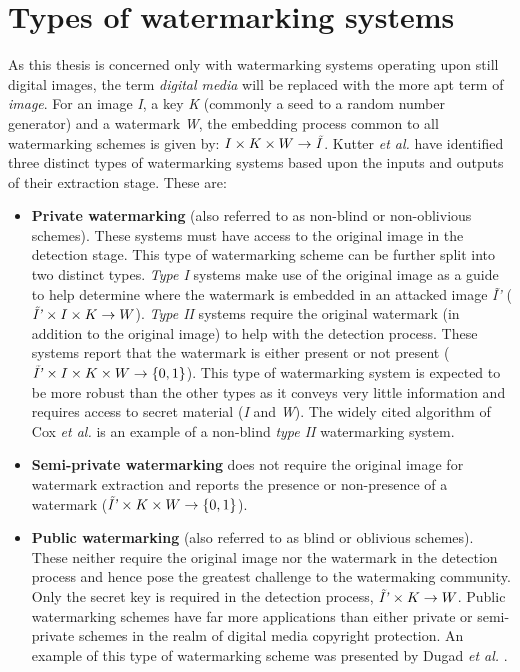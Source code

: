 \documentclass[12pt]{report}
\begin{document}
\section{Types of watermarking systems}
As this thesis is concerned only with watermarking systems operating upon still digital images, the term
\emph{digital media} will be replaced with the more apt term of \emph{image}.
For an image \emph{I}, a key \emph{K} (commonly a seed to a random number generator) and a watermark \emph{W},
the embedding process common to all watermarking schemes is 
given by: $I \times K \times W \rightarrow \mbox{\emph{\~{I}}}$.
Kutter \emph{et al.} \cite{petit99} have 
identified three distinct types of watermarking systems based upon the inputs
and outputs of their extraction stage. These are:
\begin{itemize}
	\item {\bf Private watermarking} (also referred to as non-blind or non-oblivious schemes). 
	These systems must have access to the original image in the detection stage. 
	This type of watermarking scheme can be further split into two distinct types. 
	\emph{Type I} systems make use of the original image as a guide to help determine where the 
	watermark is embedded in an attacked 
	image \emph{\~{I}'} ($\mbox{\emph{\~{I}'}} \times I \times K \rightarrow W$).  
	\emph{Type II} systems require the original watermark (in addition to the original image)
	to help with the detection process. These systems report that the watermark is
	either present or not present ($\mbox{\emph{\~{I}'}} \times I \times K \times W \rightarrow \{0,1\}$).
	This type of watermarking system is expected to be more robust than the other types as
	it conveys very little information and requires access to secret material (\emph{I} and \emph{W}).
	The widely cited 
	algorithm of Cox \emph{et al.} \cite{cox1} is 
	an example of a non-blind \emph{type II} watermarking system.

	\item {\bf Semi-private watermarking} does not require the original image for watermark extraction and
	reports the presence or non-presence of a watermark
	($\mbox{\emph{\~{I}'}} \times K \times W \rightarrow \{0,1\}$).

	\item {\bf Public watermarking} (also referred to as blind or oblivious schemes).
	These neither require the original image nor the watermark in the detection process and hence
	pose the greatest challenge to the watermaking community. Only the secret key is required in the
	detection process, $\mbox{\emph{\~{I}'}} \times K \rightarrow W$. 
	Public watermarking schemes have 
	far more applications than either private or semi-private schemes in the realm of digital 
	media copyright protection. An example of this type of watermarking scheme was presented
	by Dugad \emph{et al.} \cite{dugadDI}.
	
\end{itemize}
\end{document}
